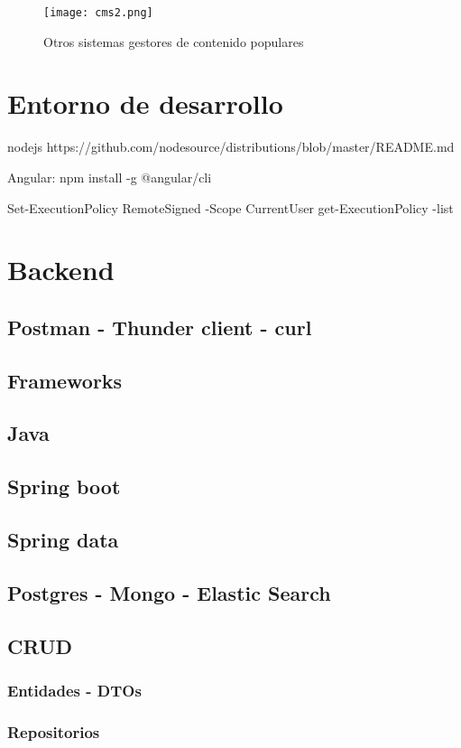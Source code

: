 \begin{figure}[H]
	\center
	\texttt{[image: cms2.png]}
	\caption{Otros sistemas gestores de contenido populares}
	\label{fig:super}
\end{figure}

\section{Entorno de desarrollo}

nodejs
https://github.com/nodesource/distributions/blob/master/README.md

Angular: npm install -g @angular/cli

Set-ExecutionPolicy RemoteSigned -Scope CurrentUser
get-ExecutionPolicy -list

\section{Backend}
\subsection{Postman - Thunder client - curl}
\subsection{Frameworks}
\subsection{Java}
\subsection{Spring boot}
\subsection{Spring data}
\subsection{Postgres - Mongo - Elastic Search}
\subsection{CRUD}
\subsubsection{Entidades - DTOs}
\subsubsection{Repositorios}
